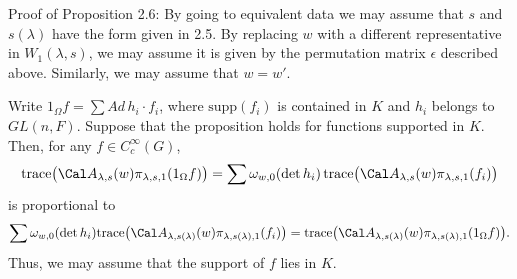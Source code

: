 \pproclaim Proof of Proposition 2.6:
By going to equivalent data we may assume that 
  $s$ and 
  $ s(\lambda) $
have the form given in 2.5.
By replacing $w$ with a different representative in
  $ W_1(\lambda,s) $,
we may assume it is given by the permutation matrix $\epsilon$
described above.
Similarly, we may assume that
  $ w = w' $.

Write
  $ 1_{\Omega} f =
   \sum Ad \, h_i \cdot f_i $,
where
  $ \text {supp} (f_i)$ is contained in $K$
and
  $ h_i$ belongs to $GL(n,F)$.
Suppose that the proposition holds for functions supported in $K$.
Then, for any 
  $ f \in C_c^{\infty}(G) $,
%
$$
  \text{trace}
  \bigl(
    {\Cal A}_{\lambda,s} (w)
    \pi_{\lambda,s,1}
    (1_{\Omega} f)
  \bigr)
=
  \sum
  \omega_{w,0}
  (\det h_i) \,
  \text{trace}
  \bigl(
    {\Cal A}_{\lambda,s} (w)
    \pi_{\lambda,s,1}
    (f_i)
  \bigr)
$$
%
is proportional to
%
$$
  \sum  \omega_{w,0}
  ( \det h_i)
  \text{trace}
  \bigl(
    {\Cal A}_{\lambda,s(\lambda)} (w)
    \pi_{\lambda,s(\lambda),1}
    (f_i)
  \bigr)
=  
  \text{trace}
  \bigl(
    {\Cal A}_{\lambda,s(\lambda)} (w)
    \pi_{\lambda,s(\lambda),1}
    (1_{\Omega}f)
  \bigr).
$$
%
Thus, we may assume that the support of $f$ lies in $K$.

